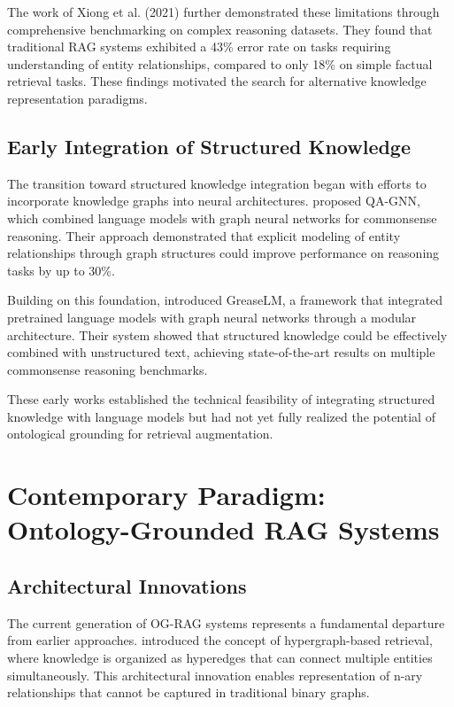 \documentclass[12pt]{report}
\begin{document}
The work of Xiong et al. (2021) further demonstrated these limitations through comprehensive benchmarking on complex reasoning datasets. They found that traditional RAG systems exhibited a 43\% error rate on tasks requiring understanding of entity relationships, compared to only 18\% on simple factual retrieval tasks. These findings motivated the search for alternative knowledge representation paradigms.

\subsection{Early Integration of Structured Knowledge}

The transition toward structured knowledge integration began with efforts to incorporate knowledge graphs into neural architectures. \citet{yasunagaQAGNNReasoningLanguage2022} proposed QA-GNN, which combined language models with graph neural networks for commonsense reasoning. Their approach demonstrated that explicit modeling of entity relationships through graph structures could improve performance on reasoning tasks by up to 30\%.

Building on this foundation, \citet{zhangGreaseLMGraphREASoning2022} introduced GreaseLM, a framework that integrated pretrained language models with graph neural networks through a modular architecture. Their system showed that structured knowledge could be effectively combined with unstructured text, achieving state-of-the-art results on multiple commonsense reasoning benchmarks.

These early works established the technical feasibility of integrating structured knowledge with language models but had not yet fully realized the potential of ontological grounding for retrieval augmentation.

\section{Contemporary Paradigm: Ontology-Grounded RAG Systems}

\subsection{Architectural Innovations}

The current generation of OG-RAG systems represents a fundamental departure from earlier approaches. \citet{edge2024local} introduced the concept of hypergraph-based retrieval, where knowledge is organized as hyperedges that can connect multiple entities simultaneously. This architectural innovation enables representation of n-ary relationships that cannot be captured in traditional binary graphs.
\end{document}
